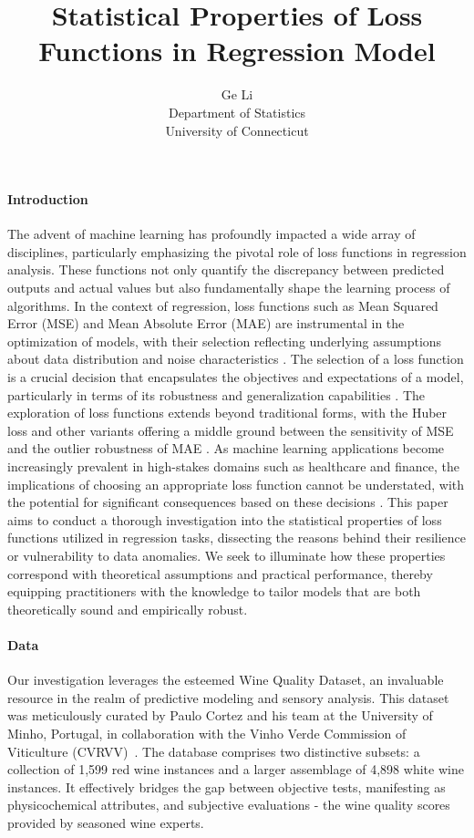 \documentclass[12pt]{article}
\title{Statistical Properties of Loss Functions in Regression Model}
\author{Ge Li\\
  Department of Statistics\\
  University of Connecticut
}
\begin{document}
\maketitle


\paragraph{Introduction}
The advent of machine learning has profoundly impacted a wide array of disciplines, particularly emphasizing the pivotal role of loss functions in regression analysis. These functions not only quantify the discrepancy between predicted outputs and actual values but also fundamentally shape the learning process of algorithms. In the context of regression, loss functions such as Mean Squared Error (MSE) and Mean Absolute Error (MAE) are instrumental in the optimization of models, with their selection reflecting underlying assumptions about data distribution and noise characteristics \cite{hastie2009elements}. The selection of a loss function is a crucial decision that encapsulates the objectives and expectations of a model, particularly in terms of its robustness and generalization capabilities \cite{friedman2001elements}. The exploration of loss functions extends beyond traditional forms, with the Huber loss and other variants offering a middle ground between the sensitivity of MSE and the outlier robustness of MAE \cite{huber2011robust}. As machine learning applications become increasingly prevalent in high-stakes domains such as healthcare and finance, the implications of choosing an appropriate loss function cannot be understated, with the potential for significant consequences based on these decisions \cite{murphy2012machine}. This paper aims to conduct a thorough investigation into the statistical properties of loss functions utilized in regression tasks, dissecting the reasons behind their resilience or vulnerability to data anomalies. We seek to illuminate how these properties correspond with theoretical assumptions and practical performance, thereby equipping practitioners with the knowledge to tailor models that are both theoretically sound and empirically robust.


\paragraph{Data}
Our investigation leverages the esteemed Wine Quality Dataset, an invaluable resource in the realm of predictive modeling and sensory analysis. This dataset was meticulously curated by Paulo Cortez and his team at the University of Minho, Portugal, in collaboration with the Vinho Verde Commission of Viticulture (CVRVV)~\citep{wine_quality_source}. The database comprises two distinctive subsets: a collection of 1,599 red wine instances and a larger assemblage of 4,898 white wine instances. It effectively bridges the gap between objective tests, manifesting as physicochemical attributes, and subjective evaluations - the wine quality scores provided by seasoned wine experts.
\end{document}
